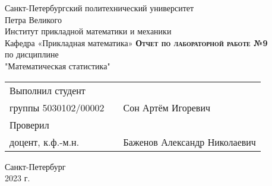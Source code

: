 \documentclass[main.tex]{subfiles}
\begin{document}
\begin{titlepage}
        \begin{center}
            \large
            Санкт-Петербургский политехнический университет\\Петра Великого\\
            \vspace{0.5cm}
            Институт прикладной математики и механики\\
            \vspace{0.25cm}
            Кафедра «Прикладная математика»
            \vfill
            \textsc{\LARGE\textbf{Отчет по лабораторной работе №9}}\\[5mm]
            \Large
            по дисциплине\\"Математическая статистика"
        \end{center}
        \vfill
        \begin{tabular}{l p{175pt} l}
            Выполнил студент \\ группы 5030102/00002 && Сон Артём Игоревич
            \vspace{0.25cm}
            \\Проверил \\ доцент, к.ф.-м.н. && Баженов Александр Николаевич
        \end{tabular}
        \vfill
        \begin{center}
            Санкт-Петербург \\ 2023 г.
        \end{center}

\end{titlepage}
\end{document}
